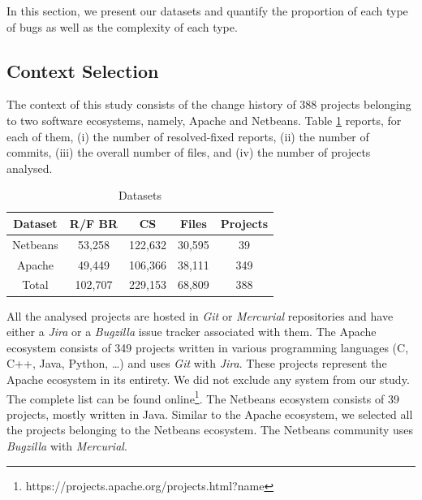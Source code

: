 \documentclass[12pt]{report}
\begin{document}
In this section, we present our datasets and quantify the proportion of
each type of bugs as well as the complexity of each type.

\subsection{\texorpdfstring{Context
Selection\label{sec:context-selection}}{Context Selection}}\label{context-selection}

The context of this study consists of the change history of 388 projects
belonging to two software ecosystems, namely, Apache and Netbeans. Table
\ref{table:datasets} reports, for each of them, (i) the number of
resolved-fixed reports, (ii) the number of commits, (iii) the overall
number of files, and (iv) the number of projects analysed.

\begin{table}[h]
\begin{center}
\begin{tabular}{@{}c|c|c|c|c@{}}
\textbf{Dataset} & \textbf{R/F BR} & \textbf{CS} & \textbf{Files} & \textbf{Projects} \\ \hline \hline
Netbeans         & 53,258          & 122,632     & 30,595         & 39                \\
Apache           & 49,449          & 106,366     & 38,111         & 349               \\
Total            & 102,707         & 229,153     & 68,809         & 388               \\ \hline \hline

\end{tabular}
\end{center}

\caption{Datasets\label{table:datasets}}
\end{table}

All the analysed projects are hosted in \emph{Git} or \emph{Mercurial}
repositories and have either a \emph{Jira} or a \emph{Bugzilla} issue
tracker associated with them. The Apache ecosystem consists of 349
projects written in various programming languages (C, C++, Java, Python,
\ldots{}) and uses \emph{Git} with \emph{Jira}. These projects represent
the Apache ecosystem in its entirety. We did not exclude any system from
our study. The complete list can be found
online\footnote{https://projects.apache.org/projects.html?name}. The
Netbeans ecosystem consists of 39 projects, mostly written in Java.
Similar to the Apache ecosystem, we selected all the projects belonging
to the Netbeans ecosystem. The Netbeans community uses \emph{Bugzilla}
with \emph{Mercurial}.
\end{document}
